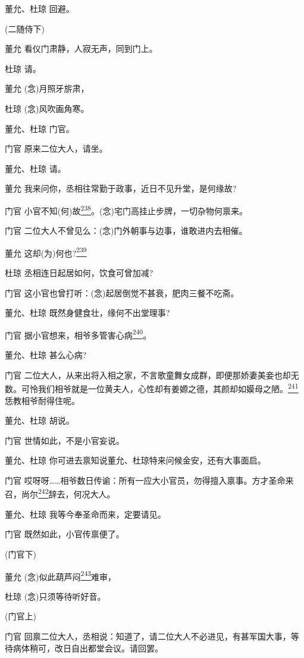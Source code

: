 董允、杜琼 回避。

(二随侍下)

董允 看仪门肃静，人寂无声，同到门上。

杜琼 请。

董允 (念)月照牙旂肃，

杜琼 (念)风吹画角寒。

董允、杜琼 门官。

门官 原来二位大人，请坐。

董允、杜琼 请。

董允 我来问你，丞相往常勤于政事，近日不见升堂，是何缘故?

门官
小官不知(何)故\protect\hyperlink{fn238}{\textsuperscript{238}}。(念)宅门高挂止步牌，一切杂物何禀来。

门官 二位大人不曾见么：(念)门外朝事与边事，谁敢进内去相催。

董允 这却(为)何也?\protect\hyperlink{fn239}{\textsuperscript{239}}

杜琼 丞相连日起居如何，饮食可曾加减?

门官 这小官也曾打听：(念)起居倒觉不甚衰，肥肉三餐不吃斋。

董允、杜琼 既然身健食壮，缘何不出堂理事?

门官
据小官想来，相爷多管害心病\protect\hyperlink{fn240}{\textsuperscript{240}}。

董允、杜琼 甚么心病?

门官
二位大人，从来出将入相之家，不言歌童舞女成群，即便那娇妻美妾也却无数。可怜我们相爷就是一位黄夫人，心性却有姜嫄之德，其颜却如嫫母之陋。\protect\hyperlink{fn241}{\textsuperscript{241}}恁教相爷耐得住呢。

董允、杜琼 胡说。

门官 世情如此，不是小官妄说。

董允、杜琼 你可进去禀知说董允、杜琼特来问候金安，还有大事面启。

门官
哎呀呀\ldots{}\ldots{}相爷数日传谕：所有一应大小官员，勿得擅入禀事。方才圣命来召，尚尔\protect\hyperlink{fn242}{\textsuperscript{242}}辞去，何况大人。

董允、杜琼 我等今奉圣命而来，定要请见。

门官 既然如此，小官传禀便了。

(门官下)

董允
(念)似此葫芦闷\protect\hyperlink{fn243}{\textsuperscript{243}}难审，

杜琼 (念)只须等待听好音。

(门官上)

门官
回禀二位大人，丞相说：知道了，请二位大人不必进见，有甚军国大事，等待病体稍可，改日自出都堂会议。请回罢。

